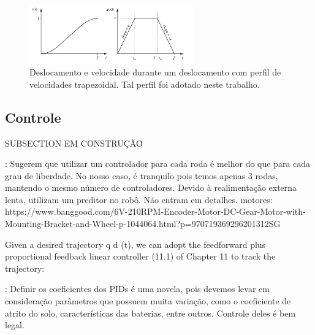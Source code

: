 \begin{figure}[h]
  \centering
  \includegraphics[width = 0.63\textwidth]{imagens/trapezoidal}
  \caption{Deslocamento e velocidade durante um deslocamento com perfil de velocidades trapezoidal. Tal perfil foi adotado neste trabalho.}
  \label{fig:trap}
\end{figure}

\subsection{Controle}

SUBSECTION EM CONSTRUÇÃO

\cite{rojas2006holonomic}: Sugerem que utilizar um controlador para cada roda é melhor do que para cada grau de liberdade. No nosso caso, é tranquilo pois temos apenas 3 rodas, mantendo o mesmo número de controladores. Devido à realimentação externa lenta, utilizam um preditor no robô. Não entram em detalhes.
motores:
https://www.banggood.com/6V-210RPM-Encoder-Motor-DC-Gear-Motor-with-Mounting-Bracket-and-Wheel-p-1044064.html?p=970719369296201312SG

Given a desired trajectory q d (t), we can adopt the feedforward plus proportional feedback linear controller (11.1) of Chapter 11 to track the trajectory: \cite{lynch2017modern}

\cite{samani2007comprehensive}: Definir os coeficientes dos PIDs é uma novela, pois devemos levar em consideração parâmetros que possuem muita variação, como o coeficiente de atrito do solo, características das baterias, entre outros. Controle deles é bem legal.



